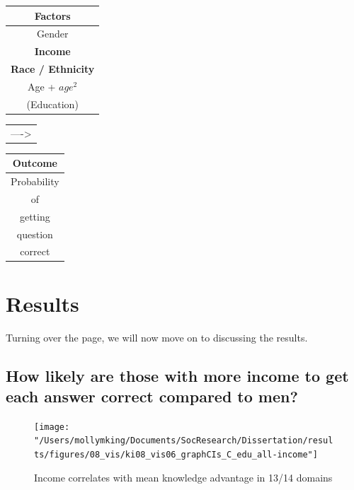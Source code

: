 \documentclass[]{article}
\begin{document}
 \begin{table}[ht]
 \centering
     \begin{tabular}{c}  %
       \hline   %
       Factors          \\
       \hline   %
       Gender           \\
       \textbf{Income}           \\
       \textbf{Race / Ethnicity} \\
       Age + $age^2$    \\
       (Education)        \\
       \hline  %
     \end{tabular}
     \begin{tabular}{l}  %
       ---->
     \end{tabular}
     \begin{tabular}{c}  %
        \hline   %
        Outcome        \\
        \hline   %
        Probability      \\
        of     \\
        getting \\
        question     \\
        correct          \\
        \hline  %
      \end{tabular}
 \end{table}


\newpage
\section{Results}\label{Results}

Turning over the page, we will now move on to discussing the results.

\subsection{How likely are those with more income to get each answer correct compared to men?}
\begin{figure}[ht]
    \begin{center}
      \texttt{[image: "/Users/mollymking/Documents/SocResearch/Dissertation/results/figures/08\_vis/ki08\_vis06\_graphCIs\_C\_edu\_all-income"]}
      \caption{Income correlates with mean knowledge advantage in 13/14 domains}
    \end{center}
\end{figure}
\end{document}
